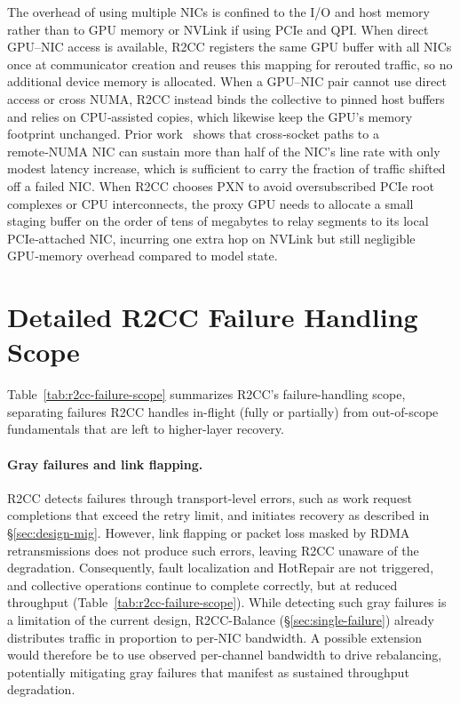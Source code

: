 \documentclass[letterpaper,twocolumn,10pt]{article}
\begin{document}
The overhead of using multiple NICs is confined to the I/O and host memory rather than to GPU memory or NVLink if using PCIe and QPI. When direct GPU–NIC access is available, R2CC registers the same GPU buffer with all NICs once at communicator creation and reuses this mapping for rerouted traffic, so no additional device memory is allocated. When a GPU–NIC pair cannot use direct access or cross NUMA, R2CC instead binds the collective to pinned host buffers and relies on CPU‑assisted copies, which likewise keep the GPU’s memory footprint unchanged. Prior work~\cite{liu2023hostping} shows that cross‑socket paths to a remote‑NUMA NIC can sustain more than half of the NIC’s line rate with only modest latency increase, which is sufficient to carry the fraction of traffic shifted off a failed NIC. When R2CC chooses PXN to avoid oversubscribed PCIe root complexes or CPU interconnects, the proxy GPU needs to allocate a small staging buffer on the order of tens of megabytes to relay segments to its local PCIe‑attached NIC, incurring one extra hop on NVLink but still negligible GPU‑memory overhead compared to model state.

\section{Detailed R2CC Failure Handling Scope}\label{app:failure-scope}

Table~\ref{tab:r2cc-failure-scope} summarizes R2CC's failure-handling scope, separating failures R2CC handles in-flight (fully or partially) from out-of-scope fundamentals that are left to higher-layer recovery.

\paragraph{Gray failures and link flapping.}\label{app:gray-failure}
R2CC detects failures through transport-level errors, such as work request completions that exceed the retry limit, and initiates recovery as described in \S\ref{sec:design-mig}. However, link flapping or packet loss masked by RDMA retransmissions does not produce such errors, leaving R2CC unaware of the degradation. Consequently, fault localization and HotRepair are not triggered, and collective operations continue to complete correctly, but at reduced throughput (Table~\ref{tab:r2cc-failure-scope}).
While detecting such gray failures is a limitation of the current design, R2CC-Balance (\S\ref{sec:single-failure}) already distributes traffic in proportion to per-NIC bandwidth. A possible extension would therefore be to use observed per-channel bandwidth to drive rebalancing, potentially mitigating gray failures that manifest as sustained throughput degradation.
\end{document}
